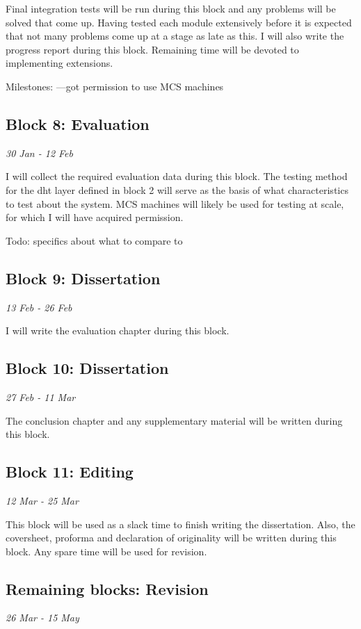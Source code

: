 \documentclass[12pt]{article}
\begin{document}
Final integration tests will be run during this block and any problems will be solved that come up. Having tested each module extensively before it is expected that not many problems come up at a stage as late as this. I will also write the progress report during this block. Remaining time will be devoted to implementing extensions.

Milestones:
---got permission to use MCS machines

\subsection{Block 8: Evaluation}
\emph{30 Jan - 12 Feb} %

I will collect the required evaluation data during this block. The testing method for the \gls{dht} layer defined in block 2 will serve as the basis of what characteristics to test about the system. MCS machines will likely be used for testing at scale, for which I will have acquired permission.

Todo: specifics about what to compare to

\subsection{Block 9: Dissertation}
\emph{13 Feb - 26 Feb} %

I will write the evaluation chapter during this block.

\subsection{Block 10: Dissertation}
\emph{27 Feb - 11 Mar} %

The conclusion chapter and any supplementary material will be written during this block.

\subsection{Block 11: Editing}
\emph{12 Mar - 25 Mar} %

This block will be used as a slack time to finish writing the dissertation. Also, the coversheet, proforma and declaration of originality will be written during this block. Any spare time will be used for revision.

\subsection{Remaining blocks: Revision}
\emph{26 Mar - 15 May}  %
\end{document}
